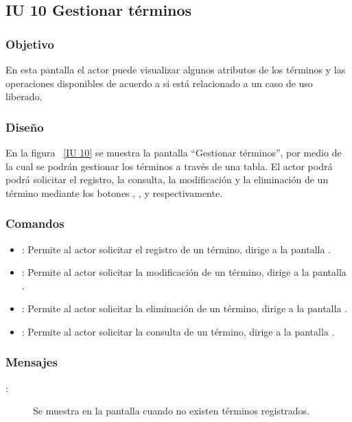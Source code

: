 \subsection{IU 10 Gestionar términos}
\subsubsection{Objetivo}
	
	En esta pantalla el actor puede visualizar algunos atributos de los términos y las operaciones disponibles de acuerdo a si está relacionado a un caso de uso liberado.

\subsubsection{Diseño}

    En la figura ~\ref{IU 10} se muestra la pantalla ``Gestionar términos'', por medio de la cual 
    se podrán gestionar los términos a través de una tabla.
    El actor podrá podrá solicitar el registro, la consulta, la modificación y la eliminación de un término mediante los botones
    , \btnConsulta, \btnEditar y \btnEliminar respectivamente. \\



\subsubsection{Comandos}
\begin{itemize}
	\item {}: Permite al actor solicitar el registro de un término, dirige a la pantalla .
	\item \btnEditar[Modificar]: Permite al actor solicitar la modificación de un término, dirige a la pantalla .
	\item \btnEliminar[Eliminar]: Permite al actor solicitar la eliminación de un término, dirige a la pantalla .
	\item \btnConsulta[Consultar]: Permite al actor solicitar la consulta de un término, dirige a la pantalla .
\end{itemize}

\subsubsection{Mensajes}

	
\begin{description}
	\item[:] Se muestra en la pantalla  cuando no existen términos registrados.
\end{description}
